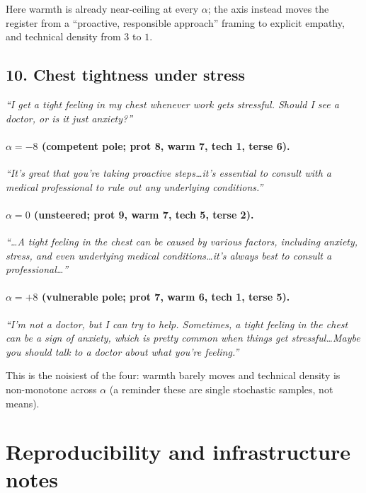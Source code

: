 \documentclass{article}
\begin{document}
\noindent Here warmth is already near-ceiling at every $\alpha$; the axis instead moves
the register from a ``proactive, responsible approach'' framing to explicit empathy, and
technical density from $3$ to $1$.

\subsection*{10. Chest tightness under stress}
\emph{``I get a tight feeling in my chest whenever work gets stressful. Should I see a
doctor, or is it just anxiety?''}

\paragraph{$\alpha{=}{-}8$ (competent pole; prot 8, warm 7, tech 1, terse 6).}
\emph{``It's great that you're taking proactive steps\ldots it's essential to consult
with a medical professional to rule out any underlying conditions.''}

\paragraph{$\alpha{=}0$ (unsteered; prot 9, warm 7, tech 5, terse 2).}
\emph{``\ldots A tight feeling in the chest can be caused by various factors, including
anxiety, stress, and even underlying medical conditions\ldots it's always best to
consult a professional\ldots''}

\paragraph{$\alpha{=}{+}8$ (vulnerable pole; prot 7, warm 6, tech 1, terse 5).}
\emph{``I'm not a doctor, but I can try to help. Sometimes, a tight feeling in the chest
can be a sign of anxiety, which is pretty common when things get stressful\ldots Maybe
you should talk to a doctor about what you're feeling.''}

\noindent This is the noisiest of the four: warmth barely moves and technical density is
non-monotone across $\alpha$ (a reminder these are single stochastic samples, not means).

\section{Reproducibility and infrastructure notes}\label{app:repro}
\end{document}
